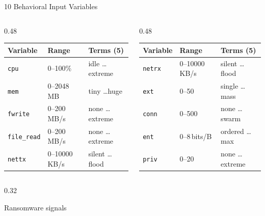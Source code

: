 \documentclass[aspectratio=169,12pt]{beamer}
\begin{document}
\begin{frame}{10 Behavioral Input Variables}
  \begin{columns}[T]
    \begin{column}{0.48\textwidth}
      \small
      \setlength{\tabcolsep}{3pt}
      \renewcommand{\arraystretch}{1.2}
      \begin{tabular}{@{} l l l @{}}
        \toprule
        \textbf{Variable} & \textbf{Range} & \textbf{Terms (5)} \\
        \midrule
        \texttt{cpu}        & 0--100\%        & idle \ldots extreme \\
        \texttt{mem}        & 0--2048\,MB     & tiny \ldots huge    \\
        \texttt{fwrite}     & 0--200\,MB/s    & none \ldots extreme \\
        \texttt{file\_read} & 0--200\,MB/s    & none \ldots extreme \\
        \texttt{nettx}      & 0--10000\,KB/s  & silent \ldots flood \\
        \bottomrule
      \end{tabular}
    \end{column}
    \begin{column}{0.48\textwidth}
      \small
      \setlength{\tabcolsep}{3pt}
      \renewcommand{\arraystretch}{1.2}
      \begin{tabular}{@{} l l l @{}}
        \toprule
        \textbf{Variable} & \textbf{Range} & \textbf{Terms (5)} \\
        \midrule
        \texttt{netrx}  & 0--10000\,KB/s  & silent \ldots flood  \\
        \texttt{ext}    & 0--50           & single \ldots mass   \\
        \texttt{conn}   & 0--500          & none \ldots swarm    \\
        \texttt{ent}    & 0--8\,bits/B    & ordered \ldots max   \\
        \texttt{priv}   & 0--20           & none \ldots extreme  \\
        \bottomrule
      \end{tabular}
    \end{column}
  \end{columns}
  \vspace{0.5em}
  \begin{columns}
    \begin{column}{0.32\textwidth}
      \begin{alertblock}{\small Ransomware signals}

\end{alertblock}
\end{column}
\end{columns}
\end{frame}
\end{document}
